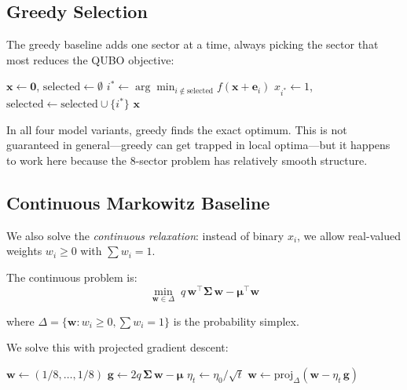 \documentclass[12pt, a4paper]{article}
\begin{document}
\subsection{Greedy Selection}

The greedy baseline adds one sector at a time, always picking the sector that
most reduces the QUBO objective:

\begin{algorithm}[H]
\caption{Greedy Sector Selection}
\begin{algorithmic}[1]
\State $\mathbf{x} \gets \mathbf{0}$, $\text{selected} \gets \emptyset$
    \State $i^* \gets \arg\min_{i \notin \text{selected}} f(\mathbf{x} + \mathbf{e}_i)$
    \State $x_{i^*} \gets 1$, $\text{selected} \gets \text{selected} \cup \{i^*\}$
\EndFor
\State \Return $\mathbf{x}$
\end{algorithmic}
\end{algorithm}

In all four model variants, greedy finds the exact optimum. This is not
guaranteed in general---greedy can get trapped in local optima---but it happens
to work here because the 8-sector problem has relatively smooth structure.

\subsection{Continuous Markowitz Baseline}

We also solve the \textit{continuous relaxation}: instead of binary $x_i$,
we allow real-valued weights $w_i \geq 0$ with $\sum w_i = 1$.

The continuous problem is:
\[
\min_{\mathbf{w} \in \Delta} \; q\, \mathbf{w}^\top \bm{\Sigma}\, \mathbf{w}
    - \bm{\mu}^\top \mathbf{w}
\]

where $\Delta = \{\mathbf{w} : w_i \geq 0, \sum w_i = 1\}$ is the probability simplex.

We solve this with projected gradient descent:

\begin{algorithm}[H]
\caption{Continuous Markowitz via Projected Gradient Descent}
\begin{algorithmic}[1]
\State $\mathbf{w} \gets (1/8, \ldots, 1/8)$
    \State $\mathbf{g} \gets 2q\, \bm{\Sigma}\, \mathbf{w} - \bm{\mu}$
    \State $\eta_t \gets \eta_0 / \sqrt{t}$ 
    \State $\mathbf{w} \gets \text{proj}_\Delta(\mathbf{w} - \eta_t\, \mathbf{g})$
\EndFor
\end{algorithmic}
\end{algorithm}
\end{document}
